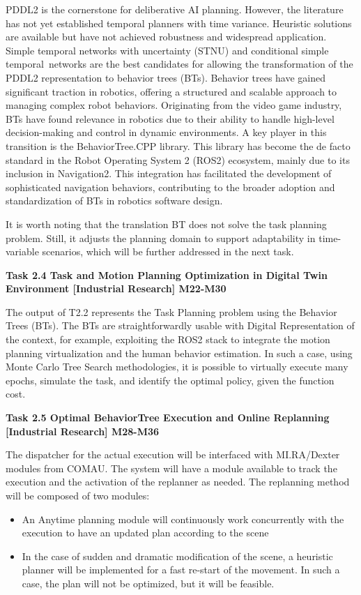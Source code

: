 \begin{planactivitybody}
PDDL2 is the cornerstone for deliberative AI planning. However, the
literature has not yet established temporal planners with time variance.
Heuristic solutions are available but have not achieved robustness and
widespread application. Simple temporal networks with uncertainty (STNU)
and conditional simple temporal~networks are the best candidates for
allowing the transformation of the PDDL2 representation to behavior
trees (BTs). Behavior trees have gained significant traction in
robotics, offering a structured and scalable approach to managing
complex robot behaviors. Originating from the video game industry, BTs
have found relevance in robotics due to their ability to handle
high-level decision-making and control in dynamic environments. A key
player in this transition is the BehaviorTree.CPP library. This library
has become the de facto standard in the Robot Operating System 2 (ROS2)
ecosystem, mainly due to its inclusion in Navigation2. This integration
has facilitated the development of sophisticated navigation behaviors,
contributing to the broader adoption and standardization of BTs in
robotics software design.

It is worth noting that the translation BT does not solve the task
planning problem. Still, it adjusts the planning domain to support
adaptability in time-variable scenarios, which will be further addressed
in the next task.

\plantaskskip
\textbf{Task 2.4 Task and Motion Planning Optimization in Digital Twin
Environment {[}Industrial Research{]} M22-M30}

The output of T2.2 represents the Task Planning problem using the
Behavior Trees (BTs). The BTs are straightforwardly usable with Digital
Representation of the context, for example, exploiting the ROS2 stack to
integrate the motion planning virtualization and the human behavior
estimation. In such a case, using Monte Carlo Tree Search methodologies,
it is possible to virtually execute many epochs, simulate the task, and
identify the optimal policy, given the function cost.

\plantaskskip
\textbf{Task 2.5 Optimal BehaviorTree Execution and Online Replanning
{[}Industrial Research{]} M28-M36}

The dispatcher for the actual execution will be interfaced with
MI.RA/Dexter modules from COMAU. The system will have a module available
to track the execution and the activation of the replanner as needed.
The replanning method will be composed of two modules:

\begin{itemize}
\item
  An Anytime planning module will continuously work concurrently with
  the execution to have an updated plan according to the scene
\item
  In the case of sudden and dramatic modification of the scene, a
  heuristic planner will be implemented for a fast re-start of the
  movement. In such a case, the plan will not be optimized, but it will
  be feasible.
\end{itemize}


\end{planactivitybody}
